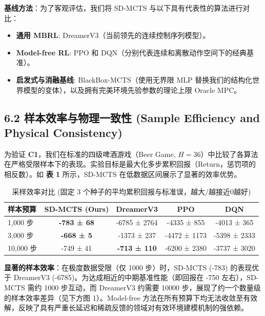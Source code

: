 \documentclass[UTF8]{ctexart}
\begin{document}
\textbf{基线方法}：为了客观评估，我们将 SD-MCTS 与以下具有代表性的算法进行对比：

\begin{itemize}
\item \textbf{通用 MBRL}: DreamerV3（当前领先的连续控制序列模型）。
\item \textbf{Model-free RL}: PPO 和 DQN（分别代表连续和离散动作空间下的经典基准）。
\item \textbf{启发式与消融基线}: BlackBox-MCTS（使用无界限 MLP 替换我们的结构化世界模型的变体），以及拥有完美环境先验参数的理论上限 Oracle MPC。
\end{itemize}

\hypertarget{ux6837ux672cux6548ux7387ux4e0eux7269ux7406ux4e00ux81f4ux6027-sample-efficiency-and-physical-consistency}{%
\subsection{6.2 样本效率与物理一致性 (Sample Efficiency and Physical
Consistency)}\label{ux6837ux672cux6548ux7387ux4e0eux7269ux7406ux4e00ux81f4ux6027-sample-efficiency-and-physical-consistency}}

为验证 \textbf{C1}，我们在标准的四级啤酒游戏（Beer Game,
\(H=36\)）中比较了各算法在严格受限样本下的表现。实验目标是最大化多步累积回报（Return，惩罚项的相反数）。如
\textbf{表 1} 所示，SD-MCTS 在低数据区间展示了显著的效率优势。

\begin{table}[ht]
\centering
\caption{采样效率对比 (固定 3 个种子的平均累积回报与标准误，越大/越接近0越好)}
\begin{tabular}{l c c c c}
\toprule
样本预算 & SD-MCTS (Ours) & DreamerV3 & PPO & DQN \\
\midrule
1,000 步 & \textbf{-783 ± 68} & -6785 ± 2764 & -4335 ± 855 & -4013 ± 365 \\
3,000 步 & \textbf{-668 ± 5} & -1373 ± 237 & -4472 ± 1173 & -5398 ± 2333 \\
10,000 步 & -749 ± 41 & \textbf{-713 ± 110} & -6200 ± 2380 & -3737 ± 3020 \\
\bottomrule
\end{tabular}
\end{table}

\textbf{显著的样本效率}：在极度数据受限（仅 1000 步）时，SD-MCTS (-783)
的表现优于 DreamerV3 (-6785)。为达成相近的中期基准性能（即回报在 -750
左右），SD-MCTS 需约 1000 步互动，而 DreamerV3 约需要 10000
步，展现了约一个数量级的样本效率差异（见下方图 1）。Model-free
方法在所有预算下均无法收敛至有效解，反映了具有严重长延迟和稀疏反馈的领域对有效环境建模机制的强依赖。
\end{document}
